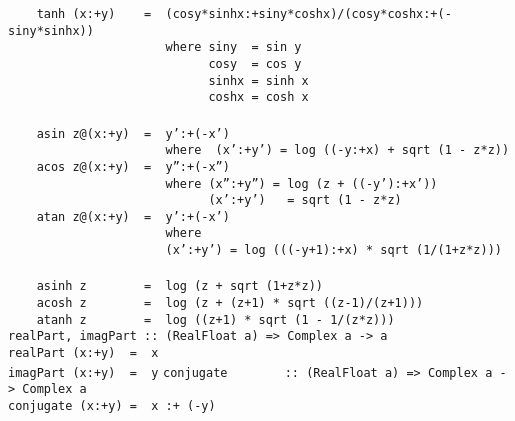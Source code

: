 \mbox{\tt \ \ \ \ tanh\ (x:+y)\ \ \ \ =\ \ (cosy*sinhx:+siny*coshx)/(cosy*coshx:+(-siny*sinhx))}\\
\mbox{\tt \ \ \ \ \ \ \ \ \ \ \ \ \ \ \ \ \ \ \ \ \ \ where\ siny\ \ =\ sin\ y}\\
\mbox{\tt \ \ \ \ \ \ \ \ \ \ \ \ \ \ \ \ \ \ \ \ \ \ \ \ \ \ \ \ cosy\ \ =\ cos\ y}\\
\mbox{\tt \ \ \ \ \ \ \ \ \ \ \ \ \ \ \ \ \ \ \ \ \ \ \ \ \ \ \ \ sinhx\ =\ sinh\ x}\\
\mbox{\tt \ \ \ \ \ \ \ \ \ \ \ \ \ \ \ \ \ \ \ \ \ \ \ \ \ \ \ \ coshx\ =\ cosh\ x}\\
\mbox{\tt }\\[-8pt]
\mbox{\tt \ \ \ \ asin\ z@(x:+y)\ \ =\ \ y':+(-x')}\\
\mbox{\tt \ \ \ \ \ \ \ \ \ \ \ \ \ \ \ \ \ \ \ \ \ \ where\ \ (x':+y')\ =\ log\ ((-y:+x)\ +\ sqrt\ (1\ -\ z*z))}\\
\mbox{\tt \ \ \ \ acos\ z@(x:+y)\ \ =\ \ y'':+(-x'')}\\
\mbox{\tt \ \ \ \ \ \ \ \ \ \ \ \ \ \ \ \ \ \ \ \ \ \ where\ (x'':+y'')\ =\ log\ (z\ +\ ((-y'):+x'))}\\
\mbox{\tt \ \ \ \ \ \ \ \ \ \ \ \ \ \ \ \ \ \ \ \ \ \ \ \ \ \ \ \ (x':+y')\ \ \ =\ sqrt\ (1\ -\ z*z)}\\
\mbox{\tt \ \ \ \ atan\ z@(x:+y)\ \ =\ \ y':+(-x')}\\
\mbox{\tt \ \ \ \ \ \ \ \ \ \ \ \ \ \ \ \ \ \ \ \ \ \ where}\\
\mbox{\tt \ \ \ \ \ \ \ \ \ \ \ \ \ \ \ \ \ \ \ \ \ \ (x':+y')\ =\ log\ (((-y+1):+x)\ *\ sqrt\ (1/(1+z*z)))}\\
\mbox{\tt }\\[-8pt]
\mbox{\tt \ \ \ \ asinh\ z\ \ \ \ \ \ \ \ =\ \ log\ (z\ +\ sqrt\ (1+z*z))}\\
\mbox{\tt \ \ \ \ acosh\ z\ \ \ \ \ \ \ \ =\ \ log\ (z\ +\ (z+1)\ *\ sqrt\ ((z-1)/(z+1)))}\\
\mbox{\tt \ \ \ \ atanh\ z\ \ \ \ \ \ \ \ =\ \ log\ ((z+1)\ *\ sqrt\ (1\ -\ 1/(z*z)))}
%
\eprogB\noindent\bprogB
\mbox{\tt realPart,\ imagPart\ ::\ (RealFloat\ a)\ =>\ Complex\ a\ ->\ a}\\
\mbox{\tt realPart\ (x:+y)\ \ =\ \ x}\\
\mbox{\tt imagPart\ (x:+y)\ \ =\ \ y}
%
%
\eprogB\noindent\bprogB
\mbox{\tt conjugate\ \ \ \ \ \ \ \ ::\ (RealFloat\ a)\ =>\ Complex\ a\ ->\ Complex\ a}\\
\mbox{\tt conjugate\ (x:+y)\ =\ \ x\ :+\ (-y)}

